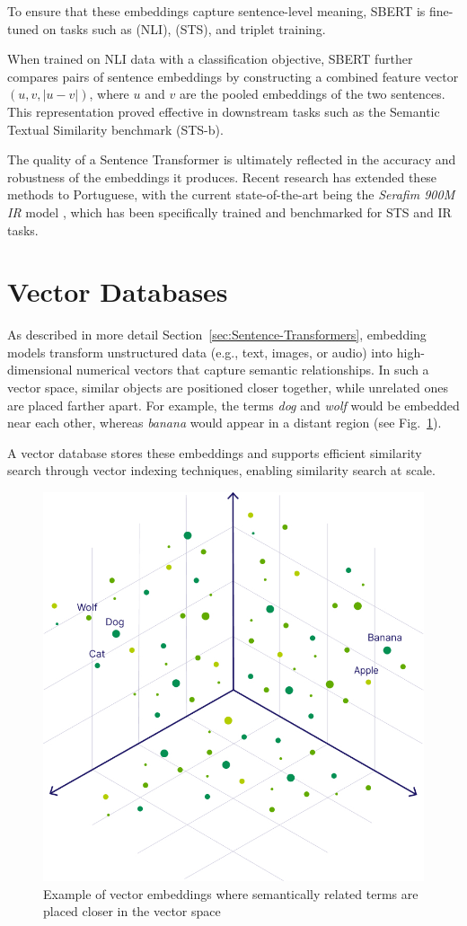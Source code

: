 To ensure that these embeddings capture sentence-level meaning, SBERT is fine-tuned on tasks such as (\gls{NLI}), (\gls{STS}), and triplet training. 

When trained on \gls{NLI} data with a classification objective, SBERT further compares pairs of sentence embeddings by constructing a combined feature vector $(u, v, |u-v|)$, where $u$ and $v$ are the pooled embeddings of the two sentences. This representation proved effective in downstream tasks such as the Semantic Textual Similarity benchmark (\gls{STS}-b).

The quality of a Sentence Transformer is ultimately reflected in the accuracy and robustness of the embeddings it produces. Recent research has extended these methods to Portuguese, with the current state-of-the-art being the \textit{Serafim 900M IR} model \cite{gomes2024opensentenceembeddingsportuguese}, which has been specifically trained and benchmarked for \gls{STS} and \gls{IR} tasks.

\section{Vector Databases}
\label{sec:vector-store}
As described in more detail Section~\ref{sec:Sentence-Transformers}, embedding models transform unstructured data (e.g., text, images, or audio) into high-dimensional numerical vectors that capture semantic relationships. In such a vector space, similar objects are positioned closer together, while unrelated ones are placed farther apart. For example, the terms \emph{dog} and \emph{wolf} would be embedded near each other, whereas \emph{banana} would appear in a distant region (see Fig.~\ref{fig:vector-embedding}).  

A vector database stores these embeddings and supports efficient similarity search through vector indexing techniques, enabling similarity search at scale.
\begin{figure}[h]
    \centering
    \includegraphics[width=0.55\linewidth]{Images/vector-embedding.jpg}
    \caption{Example of vector embeddings where semantically related terms are placed closer in the vector space \cite{weaviate}}
    \label{fig:vector-embedding}
\end{figure}

